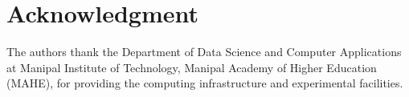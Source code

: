 \documentclass[conference]{IEEEtran}
\begin{document}
\section*{Acknowledgment}
The authors thank the Department of Data Science and Computer Applications at Manipal Institute of Technology, Manipal Academy of Higher Education (MAHE), for providing the computing infrastructure and experimental facilities.



\end{document}
